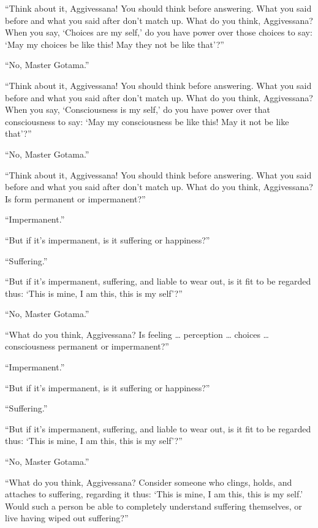 \documentclass[12pt,openany]{book}%
\begin{document}
“Think about it, Aggivessana! You should think before answering. What you said before and what you said after don’t match up. What do you think, Aggivessana? When you say, ‘Choices are my self,’ do you have power over those choices to say: ‘May my choices be like this! May they not be like that’?” 

“No, Master Gotama.” 

“Think about it, Aggivessana! You should think before answering. What you said before and what you said after don’t match up. What do you think, Aggivessana? When you say, ‘Consciousness is my self,’ do you have power over that consciousness to say: ‘May my consciousness be like this! May it not be like that’?” 

“No, Master Gotama.” 

“Think about it, Aggivessana! You should think before answering. What you said before and what you said after don’t match up. What do you think, Aggivessana? Is form permanent or impermanent?” 

“Impermanent.” 

“But if it’s impermanent, is it suffering or happiness?” 

“Suffering.” 

“But if it’s impermanent, suffering, and liable to wear out, is it fit to be regarded thus: ‘This is mine, I am this, this is my self’?” 

“No, Master Gotama.” 

“What do you think, Aggivessana? Is feeling … perception … choices … consciousness permanent or impermanent?” 

“Impermanent.” 

“But if it’s impermanent, is it suffering or happiness?” 

“Suffering.” 

“But if it’s impermanent, suffering, and liable to wear out, is it fit to be regarded thus: ‘This is mine, I am this, this is my self’?” 

“No, Master Gotama.” 

“What do you think, Aggivessana? Consider someone who clings, holds, and attaches to suffering, regarding it thus: ‘This is mine, I am this, this is my self.’ Would such a person be able to completely understand suffering themselves, or live having wiped out suffering?” 
\end{document}

